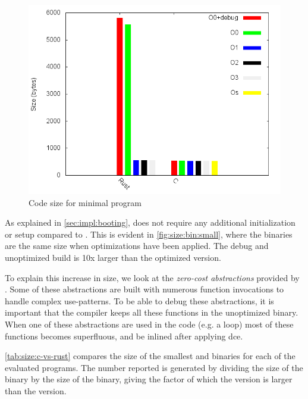\begin{figure}[H]
  \begin{center}
    \includegraphics[scale=0.5]{results/plots/size/bin/small/size.png}
  \end{center}
  \caption{Code size for minimal program}
  \label{fig:size:bin:small}
\end{figure}

As explained in \autoref{sec:impl:booting}, {\rust} does not require any additional initialization or setup compared to {\C}.
This is evident in \autoref{fig:size:bin:small}, where the binaries are the same size when optimizations have been applied.
The debug and unoptimized {\rust} build is 10x larger than the optimized version.

To explain this increase in size, we look at the \emph{zero-cost abstractions} provided by {\rust}.
Some of these abstractions are built with numerous function invocations to handle complex use-patterns.
To be able to debug these abstractions, it is important that the compiler keeps all these functions in the unoptimized binary.
When one of these abstractions are used in the code (e.g. a  loop) most of these functions becomes superfluous, and be inlined after applying \gls{dce}.

\autoref{tab:size:c-vs-rust} compares the size of the smallest {\C} and {\rust} binaries for each of the evaluated programs.
The number reported is generated by dividing the size of the {\rust} binary by the size of the {\C} binary, giving the factor of which the {\rust} version is larger than the {\C} version.

